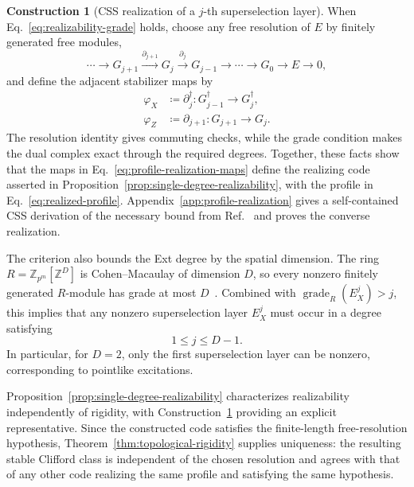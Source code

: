 \documentclass[aps,prx,english,superscriptaddress,twocolumn,tightenlines,showpacs,longbibliography,floatfix,amsfonts]{revtex4-2}
\theoremstyle{remark}
\theoremstyle{definition}
\newtheorem{construction}{Construction}
\begin{document}
\begin{construction}[CSS realization of a \(j\)-th superselection layer]
\label{constr:single-degree-realization}
When Eq.~\eqref{eq:realizability-grade} holds,
choose any free resolution of \(E\) by finitely generated free modules,
\begin{equation}
	\cdots\longrightarrow
	G_{j+1}\xrightarrow{\partial_{j+1}}G_j
	\xrightarrow{\partial_j}G_{j-1}
	\longrightarrow\cdots\longrightarrow
	G_0\longrightarrow E\longrightarrow0,
\end{equation}
and define the adjacent stabilizer maps by
\begin{equation}
	\begin{aligned}
		\varphi_X
		&\coloneqq
		\partial_j^\dagger
		\colon G_{j-1}^\dagger\longrightarrow G_j^\dagger,\\
		\varphi_Z
		&\coloneqq
		\partial_{j+1}
		\colon G_{j+1}\longrightarrow G_j.
	\end{aligned}
	\label{eq:profile-realization-maps}
\end{equation}
The resolution identity gives commuting checks, while the grade condition
makes the dual complex exact through the required degrees. Together, these
facts show that the maps in Eq.~\eqref{eq:profile-realization-maps} define the
realizing code asserted in Proposition~\ref{prop:single-degree-realizability},
with the profile in Eq.~\eqref{eq:realized-profile}.
Appendix~\ref{app:profile-realization} gives a self-contained CSS derivation of
the necessary bound from Ref.~\cite[Prop.~25]{Yang2023} and proves the converse
realization.
\end{construction}

The criterion also bounds the Ext degree by the spatial dimension. The ring
\(R=\mathbb Z_{p^m}[\mathbb Z^D]\) is Cohen--Macaulay of dimension \(D\),
so every nonzero finitely generated \(R\)-module has grade at most
\(D\)~\cite[Chap.~18]{eisenbud1995commutative}. Combined with
\(\operatorname{grade}_R(E_X^j)>j\), this implies that any nonzero
superselection layer \(E_X^j\) must occur in a degree satisfying
\begin{equation}
	1\leq j\leq D-1.
	\label{eq:spatial-grade-bound}
\end{equation}
In particular, for \(D=2\), only the first superselection layer can
be nonzero, corresponding to pointlike excitations.

Proposition~\ref{prop:single-degree-realizability} characterizes
realizability independently of rigidity, with
Construction~\ref{constr:single-degree-realization} providing an explicit
representative. Since the constructed code satisfies the finite-length
free-resolution hypothesis, Theorem~\ref{thm:topological-rigidity} supplies
uniqueness: the resulting stable Clifford class is independent of the chosen
resolution and agrees with that of any other code realizing the same profile
and satisfying the same hypothesis.
\end{document}

